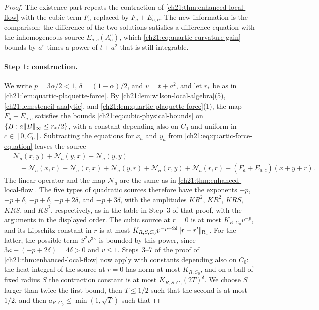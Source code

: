 \begin{proof}
The existence part repeats the contraction of \cref{ch21:thm:enhanced-local-flow} with the cubic term $F_a$ replaced by $F_a+E_{a,c}$. The new information is the comparison: the difference of the two solutions satisfies a difference equation with the inhomogeneous source $E_{a,c}(A^c_a)$, which \eqref{ch21:eq:quartic-curvature-gain} bounds by $a^\varepsilon$ times a power of $t+a^2$ that is still integrable.

\paragraph{Step 1: construction.}
We write $p=3\alpha/2<1$, $\delta=(1-\alpha)/2$, and $v=t+a^2$, and let $r_*$ be as in \cref{ch21:lem:quartic-plaquette-force}. By \cref{ch21:lem:wilson-local-algebra}(5), \cref{ch21:lem:stencil-analytic}, and \cref{ch21:lem:quartic-plaquette-force}(1), the map $F_a+E_{a,c}$ satisfies the bounds \eqref{ch21:eq:cubic-physical-bounds} on $\{B:a\lVert B\rVert_\infty\le r_*/2\}$, with a constant depending also on $C_0$ and uniform in $c\in[0,C_0]$. Subtracting the equations for $x_a$ and $y_a$ from \eqref{ch21:eq:quartic-force-equation} leaves the source
\[
 \begin{split}
 &\mathcal N_a(x,y)+\mathcal N_a(y,x)+\mathcal N_a(y,y)\\
 &\quad+\mathcal N_a(x,r)+\mathcal N_a(r,x)+\mathcal N_a(y,r)+\mathcal N_a(r,y)+\mathcal N_a(r,r)+(F_a+E_{a,c})(x+y+r).
 \end{split}
\]
The linear operator and the map $\mathcal N_a$ are the same as in \cref{ch21:thm:enhanced-local-flow}. The five types of quadratic sources therefore have the exponents $-p$, $-p+\delta$, $-p+\delta$, $-p+2\delta$, and $-p+3\delta$, with the amplitudes $KR^2$, $KR^2$, $KRS$, $KRS$, and $KS^2$, respectively, as in the table in Step~3 of that proof, with the arguments in the displayed order. The cubic source at $r=0$ is at most $K_{R,C_0}v^{-p}$, and its Lipschitz constant in $r$ is at most $K_{R,S,C_0}v^{-p+2\delta}\lVert r-r'\rVert_{\mathsf R_a}$. For the latter, the possible term $S^2v^{3\kappa}$ is bounded by this power, since $3\kappa-(-p+2\delta)=4\delta>0$ and $v\le1$. Steps~3--7 of the proof of \cref{ch21:thm:enhanced-local-flow} now apply with constants depending also on $C_0$: the heat integral of the source at $r=0$ has norm at most $K_{R,C_0}$, and on a ball of fixed radius $S$ the contraction constant is at most $K_{R,S,C_0}(2T)^\delta$. We choose $S$ larger than twice the first bound, then $T\le1/2$ such that the second is at most $1/2$, and then $a_{R,C_0}\le\min(1,\sqrt T)$ such that

\end{proof}
